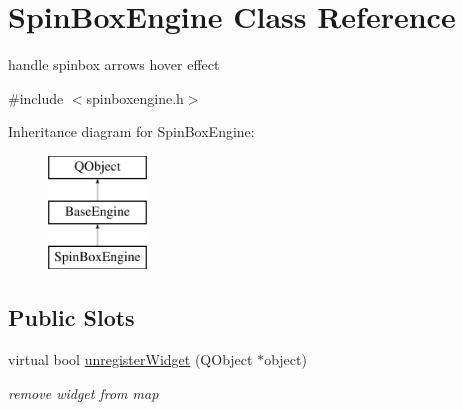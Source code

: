 \hypertarget{class_spin_box_engine}{}\section{Spin\+Box\+Engine Class Reference}
\label{class_spin_box_engine}


handle spinbox arrows hover effect  




{\ttfamily \#include $<$spinboxengine.\+h$>$}

Inheritance diagram for Spin\+Box\+Engine\+:\begin{figure}[H]
\begin{center}
\leavevmode
\includegraphics[height=3.000000cm]{class_spin_box_engine}
\end{center}
\end{figure}
\subsection*{Public Slots}
\begin{DoxyCompactItemize}
\item 
\mbox{\label{class_spin_box_engine_ad43ed5875c17926ffb9205ea04d58913}} 
virtual bool \hyperlink{class_spin_box_engine_ad43ed5875c17926ffb9205ea04d58913}{unregister\+Widget} (Q\+Object $\ast$object)
\begin{DoxyCompactList}\small\item\em remove widget from map \end{DoxyCompactList}\end{DoxyCompactItemize}
